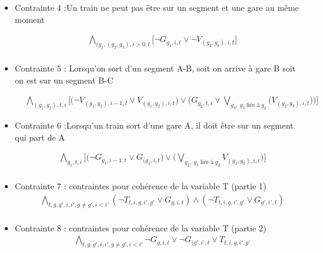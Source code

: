 \documentclass{article}
\begin{document}
\begin{itemize}
\item Contrainte 4 :Un train ne peut pas être sur un segment et une gare au même moment

\begin{equation*}
    \begin{split}
      & \bigwedge_{(g_1, (g_2, g_3), i>0, t}
      \big[\neg G_{g_1, i, t} \lor \neg V_{(g_2, g_3), i, t} \big] \\
    \end{split}
    \end{equation*}


\item Contrainte 5 : Lorsqu'on sort d'un segment A-B, soit on arrive à gare B soit on est sur un segment B-C

\begin{equation*}
    \begin{split}
      & \bigwedge_{(g_1, g_2), t, i}
      \big[
      \big(\neg V_{(g_1, g_2), i-1, t} \lor V_{(g_1, g_2), i, t} \big)
      \lor
      \big(G_{g_2, t, i} \lor \bigvee_{g_3,\ g_3\ \text{liée à}\ g_2} \big(V_{(g_2, g_3), i, t}\big) \big)
      \big]
      \end{split}
    \end{equation*}


\item Contrainte 6 :Lorsqu'un train sort d'une gare A, il doit être sur un segment qui part de A

\begin{equation*}
    \begin{split}
      & \bigwedge_{g_1, t, i}
      \big[
      \big(\neg G_{g_1, i-1, t} \lor G_{(g_1, i, t} \big)
      \lor
      \big(\bigvee_{g_2,\ g_1\ \text{liée à}\ g_2} V_{(g_1, g_2), i, t}\big) 
      \big]\\
    \end{split}
    \end{equation*}
    
\item Contrainte 7 : contraintes pour cohérence de la variable T (partie 1)
\begin{equation*}
    \begin{split}
      & \bigwedge_{t, g, g', i, i', g \neq g', i < i'}
      (\neg T_{t,i,g,i', g'} \lor G_{g, i, t} ) \land (\neg T_{t,i,g,i', g'} \lor  G_{g', i', t} )\\
    \end{split}
    \end{equation*}

\item Contrainte 8 : contraintes pour cohérence de la variable T (partie 2)
\begin{equation*}
    \begin{split}
      & \bigwedge_{t, g, g', i, i', g \neq g', i < i'}
      \neg G_{g, i, t} \lor \neg G_{(g', i', t} \lor T_{t,i,g,i', g'} \\
    \end{split}
    \end{equation*}


\end{itemize}
\end{document}
